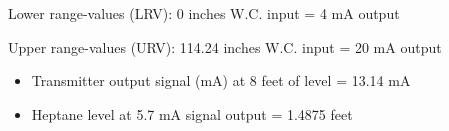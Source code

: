 
Lower range-values (LRV): 0 inches W.C. input = 4 mA output

\vskip 10pt

Upper range-values (URV): 114.24 inches W.C. input = 20 mA output

\vskip 10pt

\begin{itemize}
\item{} Transmitter output signal (mA) at 8 feet of level = 13.14 mA
\item{} Heptane level at 5.7 mA signal output = 1.4875 feet
\end{itemize}











